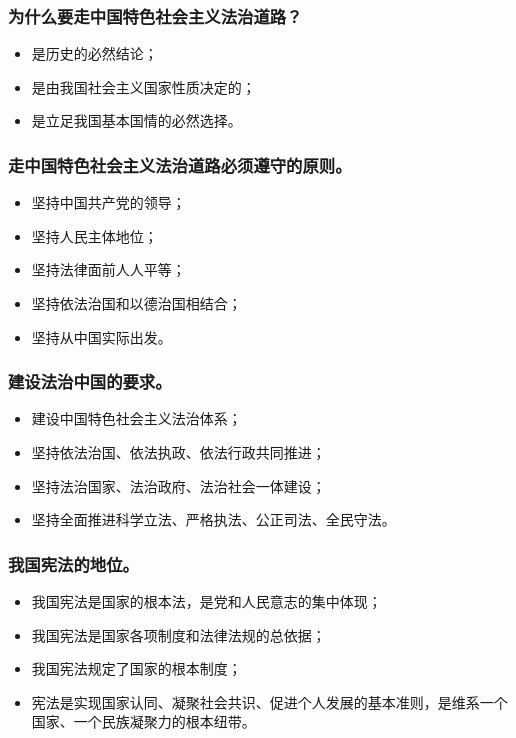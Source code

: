\documentclass{article}
\begin{document}
\subsubsection{为什么要走中国特色社会主义法治道路？}
\begin{itemize}
    \item 是历史的必然结论；
    \item 是由我国社会主义国家性质决定的；
    \item 是立足我国基本国情的必然选择。
\end{itemize}

\subsubsection{走中国特色社会主义法治道路必须遵守的原则。}
\begin{itemize}
    \item 坚持中国共产党的领导；
    \item 坚持人民主体地位；
    \item 坚持法律面前人人平等；
    \item 坚持依法治国和以德治国相结合；
    \item 坚持从中国实际出发。
\end{itemize}

\subsubsection{建设法治中国的要求。}
\begin{itemize}
    \item 建设中国特色社会主义法治体系；
    \item 坚持依法治国、依法执政、依法行政共同推进；
    \item 坚持法治国家、法治政府、法治社会一体建设；
    \item 坚持全面推进科学立法、严格执法、公正司法、全民守法。
\end{itemize}

\subsubsection{我国宪法的地位。}
\begin{itemize}
    \item 我国宪法是国家的根本法，是党和人民意志的集中体现；
    \item 我国宪法是国家各项制度和法律法规的总依据；
    \item 我国宪法规定了国家的根本制度；
    \item 宪法是实现国家认同、凝聚社会共识、促进个人发展的基本准则，是维系一个国家、一个民族凝聚力的根本纽带。
\end{itemize}
\end{document}
